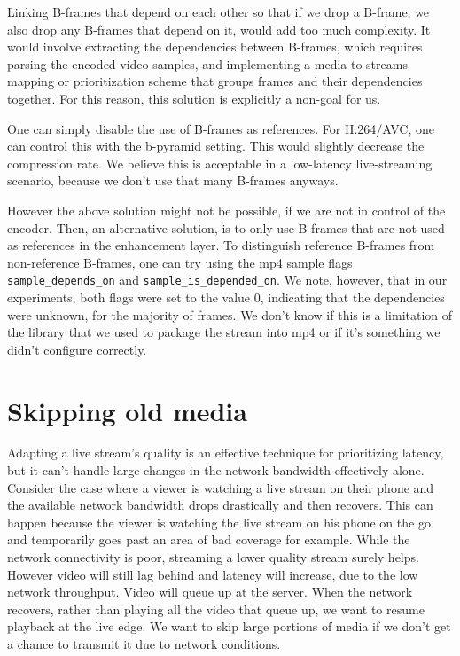 Linking B-frames that depend on each other so that if we drop a B-frame, we also drop any B-frames that depend on it, would add too much complexity. It would involve extracting the dependencies between B-frames, which requires parsing the encoded video samples, and implementing a media to streams mapping or prioritization scheme that groups frames and their dependencies together. For this reason, this solution is explicitly a non-goal for us.

One can simply disable the use of B-frames as references.  For H.264/AVC, one can control this with the b-pyramid setting. %
This would slightly decrease the compression rate. We believe this is acceptable in a low-latency live-streaming scenario, because we don't use that many B-frames anyways.

However the above solution might not be possible, if we are not in control of the encoder. Then, an alternative solution, is to only use B-frames that are not used as references in the enhancement layer. To distinguish reference B-frames from non-reference B-frames, one can try using the mp4 sample flags \lstinline{sample_depends_on} and \lstinline{sample_is_depended_on}. %
We note, however, that in our experiments, both flags were set to the value $0$, indicating that the dependencies were unknown, for the majority of frames. We don't know if this is a limitation of the library that we used to package the stream into mp4 or if it's something we didn't configure correctly. %

\chapter{Skipping old media}\label{chapter:skipping_old_media}
Adapting a live stream's quality is an effective technique for prioritizing latency, but it can't handle large changes in the network bandwidth effectively alone. Consider the case where a viewer is watching a live stream on their phone and the available network bandwidth drops drastically and then recovers. This can happen because the viewer is watching the live stream on his phone on the go and temporarily goes past an area of bad coverage for example. While the network connectivity is poor, streaming a lower quality stream surely helps. However video will still lag behind and latency will increase, due to the low network throughput. Video will queue up at the server. When the network recovers, rather than playing all the video that queue up, we want to resume playback at the live edge. We want to skip large portions of media if we don't get a chance to transmit it due to network conditions.

